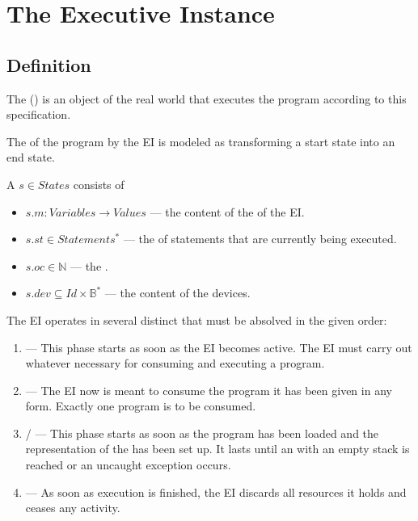 \chapter {The Executive Instance}

\section {Definition} \label{ei_definition}

The  () is an object of the real world that executes the program according to this specification.

The  of the program by the EI is modeled as transforming a start state into an end state.

A  $s \in States$ consists of
\begin{itemize}
\item $s.m: Variables \rightarrow Values$ --- the content of the  of the EI.
\item $s.st \in Statements^\ast$ --- the  of statements that are currently being executed.
\item $s.oc \in \mathbb{N}$ --- the .
\item $s.dev \subseteq Id \times \mathbb{B}^\ast $ --- the content of the devices.
\end{itemize}

The EI operates in several distinct  that must be absolved in the given order:
\begin{enumerate}
\item {} --- This phase starts as soon as the EI becomes active. The EI must carry out whatever necessary for consuming and executing a program.
\item {} --- The EI now is meant to consume the program it has been given in any form. Exactly one program is to be consumed.
\item {}/ --- This phase starts as soon as the program has been loaded and the representation of the  has been set up. It lasts until an  with an empty stack is reached or an uncaught exception occurs.
\item {} --- As soon as execution is finished, the EI discards all resources it holds and ceases any activity.
\end{enumerate}

